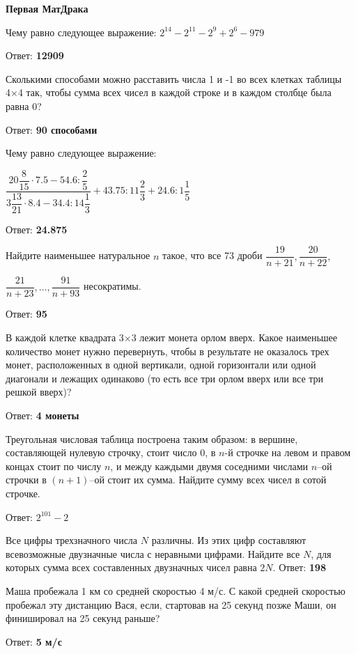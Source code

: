 \centerline{\bf \Huge Первая МатДрака }

 Чему равно следующее выражение:  $2^{14}-2^{11}-2^{9}+2^{6}-979$

Ответ: \textbf{12909}

 Сколькими способами можно расставить числа 1 и -1 во всех клетках таблицы 4×4 так, чтобы сумма всех чисел в каждой строке и в каждом столбце была равна 0?

Ответ: \textbf{90 способами}

 Чему равно следующее выражение:  

$\dfrac{20\dfrac{8}{15}\cdot7.5-54.6:\dfrac{2}{5}}{3\dfrac{13}{21}\cdot8.4-34.4:14\dfrac{1}{3}}+43.75:11\dfrac{2}{3}+24.6:1\dfrac{1}{5}$

Ответ: \textbf{24.875}

Найдите наименьшее натуральное $n$ такое, что все 73 дроби $\dfrac{19}{n+21}, \dfrac{20}{n+22},$ 

$\dfrac{21}{n+23}, …, \dfrac{91}{n+93}$ несократимы.

Ответ: \textbf{95}

 В каждой клетке квадрата 3×3 лежит монета орлом вверх. Какое наименьшее количество монет нужно перевернуть, чтобы в результате не оказалось трех монет, расположенных в одной вертикали, одной горизонтали или одной диагонали и лежащих одинаково (то есть все три орлом вверх или все три решкой вверх)?

Ответ: \textbf{4 монеты}

Треугольная числовая таблица построена таким образом: в вершине, составляющей нулевую строчку, стоит число 0, в $n$-й строчке на левом и правом концах стоит по числу $n$, и между каждыми двумя соседними числами $n$–ой строчки в $(n+1)$–ой стоит их сумма. Найдите сумму всех чисел в сотой строчке.

Ответ: \textbf{$2^{101}-2$}

Все цифры трехзначного числа $N$ различны. Из этих цифр составляют всевозможные двузначные числа с неравными цифрами. Найдите все $N$, для которых сумма всех составленных двузначных чисел равна $2N$.
Ответ: \textbf{198}

Маша пробежала 1 км со средней скоростью 4 м/с. С какой средней скоростью пробежал эту дистанцию Вася, если, стартовав на 25 секунд позже Маши, он финишировал на 25 секунд раньше?

Ответ: \textbf{5 м/с}

